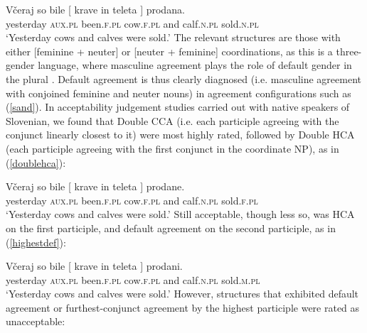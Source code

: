 \documentclass[output=paper
,modfonts
,nonflat]{langsci/langscibook}
\begin{document}
\ea \label{sand}
\gll Včeraj      so    bile       [ krave    in    teleta ]    prodana.\\
yesterday \textsc{aux.pl} been.\textsc{f.pl} {} cow.\textsc{f.pl} and calf.\textsc{n.pl} {}   sold.\textsc{n.pl} \\
\glt `Yesterday cows and calves were sold.' \citep{marusicnevinsbadecker:15}
\z
The relevant structures are those with either [feminine + neuter] or [neuter + feminine] coordinations, as this is a three-gender language, where masculine agreement plays the role of default gender in the plural \citep{marusicnevinsbadecker:15,willergold:16}. Default agreement is thus clearly diagnosed (i.e. masculine agreement with conjoined feminine and neuter nouns) in agreement configurations such as (\ref{sand}). In acceptability judgement studies carried out with native speakers of Slovenian, we found that Double CCA (i.e. each participle agreeing with the conjunct linearly closest to it) were most highly rated, followed by Double HCA (each participle agreeing with the first conjunct in the coordinate NP), as in (\ref{doublehca}):

\ea \label{doublehca}
\gll Včeraj so bile  [ krave in teleta ] prodane.\\
yesterday \textsc{aux.pl} been.\textsc{f.pl} {} cow.\textsc{f.pl} and calf.\textsc{n.pl} {} sold.\textsc{f.pl} \\
\glt `Yesterday cows and calves were sold.' 
\z
Still acceptable, though less so, was HCA on the first participle, and default agreement on the second participle, as in (\ref{highestdef}):

\ea \label{highestdef}
\gll Včeraj      so    bile       [ krave    in    teleta ]    prodani.\\
yesterday \textsc{aux.pl} been.\textsc{f.pl} {} cow.\textsc{f.pl} and calf.\textsc{n.pl} {}   sold.\textsc{m.pl} \\
\glt `Yesterday cows and calves were sold.' 
\z
However, structures that exhibited default agreement or furthest-conjunct agreement by the highest participle were rated as unacceptable:
\end{document}
